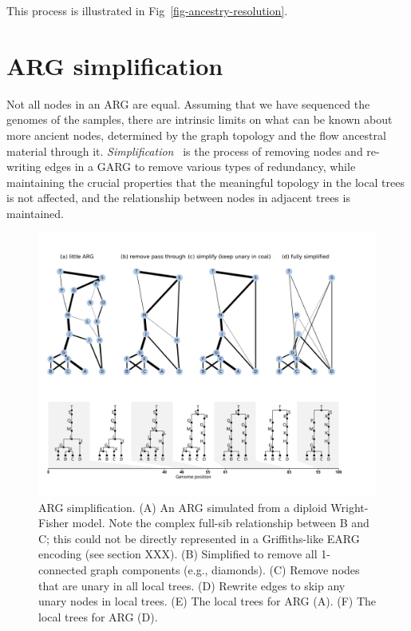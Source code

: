 \documentclass{article}
\begin{document}
This process is illustrated in Fig~\ref{fig-ancestry-resolution}.

\section*{ARG simplification}

Not all nodes in an ARG are equal. Assuming that we have sequenced the
genomes of the samples, there are intrinsic limits on what can
be known about more ancient nodes, determined by the graph topology
and the flow ancestral material through it.
\emph{Simplification}~\citep{kelleher2018efficient} is the process
of removing nodes and re-writing edges in a GARG to remove
various types of redundancy, while maintaining the crucial properties
that the meaningful topology in the local trees is not affected,
and the relationship between nodes in adjacent trees is maintained.

\begin{figure}
\centering
\vspace{5em}
\includegraphics[width=\linewidth]{illustrations/ARG_recomb_node_deletion}
\caption{\label{fig-simplification}
ARG simplification. (A) An ARG simulated from a diploid Wright-Fisher
model. Note the complex full-sib relationship between B and C; this
could not be directly represented in a Griffiths-like EARG encoding
(see section XXX).
(B) Simplified to remove all
1-connected graph components (e.g., diamonds).
(C) Remove nodes that are unary in all local trees.
(D) Rewrite edges to skip any unary nodes in local trees.
(E) The local trees for ARG (A).
(F) The local trees for ARG (D).
}
\end{figure}
\end{document}
